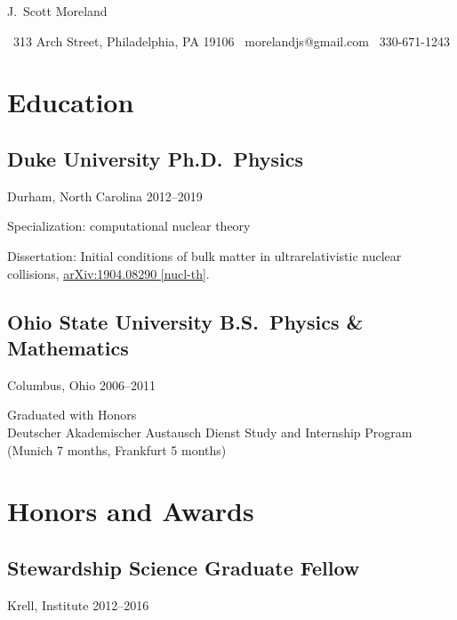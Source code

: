 \documentclass[letterpaper,10pt]{article}
\begin{document}
\newcommand{\sep}{{\quad\textbar\quad}}

\begin{center}
  {\huge\raleway J.\ Scott Moreland}
\end{center}

\begin{center}
  \small
  \, 313 Arch Street, Philadelphia, PA 19106 \sep
  \, morelandjs@gmail.com \sep
  \, 330-671-1243
\end{center}

\smallskip

\newcommand{\subheading}[3]{{\small #1 \hfill #2--#3}}

\begin{multicols}{2}

\section{Education}

\subsection{Duke University \hfill Ph.D.\ Physics}
\subheading{Durham, North Carolina}{2012}{2019}

Specialization: computational nuclear theory

\smallskip

Dissertation: Initial conditions of bulk matter in ultrarelativistic nuclear collisions,
\href{https://arxiv.org/abs/1904.08290}{\small arXiv:1904.08290 [nucl-th]}.

\subsection{Ohio State University \hfill B.S.\ Physics \& Mathematics}
\subheading{Columbus, Ohio}{2006}{2011}

Graduated with Honors\\
Deutscher Akademischer Austausch Dienst Study and Internship Program (Munich 7 months, Frankfurt 5 months)

\section{Honors and Awards}

\subsection{Stewardship Science Graduate Fellow}
\subheading{Krell, Institute}{2012}{2016}


\end{multicols}
\end{document}
